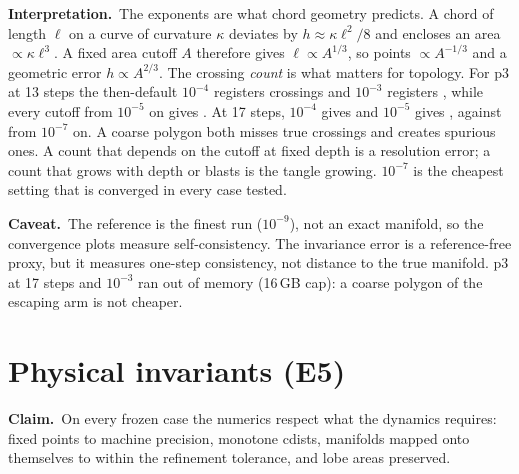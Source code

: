 \documentclass[11pt,a4paper]{article}
\newcommand{\claim}{\par\smallskip\noindent\textbf{Claim.}~}
\newcommand{\reading}{\par\smallskip\noindent\textbf{Interpretation.}~}
\newcommand{\caveat}{\par\smallskip\noindent\textbf{Caveat.}~}
\begin{document}
\reading The exponents are what chord geometry predicts. A chord of length
$\ell$ on a curve of curvature $\kappa$ deviates by $h\approx\kappa\ell^2/8$
and encloses an area $\propto\kappa\ell^3$. A fixed area cutoff $A$ therefore
gives $\ell\propto A^{1/3}$, so points $\propto A^{-1/3}$ and a geometric
error $h\propto A^{2/3}$. The crossing \emph{count} is what matters for
topology. For p3 at 13 steps the then-default $10^{-4}$ registers
\NumCrossingsPThreeThirteenCutoffFour{} crossings and $10^{-3}$ registers
\NumCrossingsPThreeThirteenCutoffThree, while every cutoff from $10^{-5}$ on
gives \NumCrossingsPThreeThirteenRef. At 17 steps, $10^{-4}$ gives
\NumCrossingsPThreeSeventeenCutoffFour{} and $10^{-5}$ gives
\NumCrossingsPThreeSeventeenCutoffFive, against \NumCrossingsPThreeSeventeenRef{}
from $10^{-7}$ on. A coarse polygon both misses true crossings and creates
spurious ones. A count that depends on the cutoff at fixed depth is a
resolution error; a count that grows with depth or blasts is the tangle
growing. $10^{-7}$ is the cheapest setting that is converged in every case
tested.

\caveat The reference is the finest run ($10^{-9}$), not an exact manifold,
so the convergence plots measure self-consistency. The invariance error is a
reference-free proxy, but it measures one-step consistency, not distance to
the true manifold. p3 at 17 steps and $10^{-3}$ ran out of memory (16\,GB
cap): a coarse polygon of the escaping arm is not cheaper.

\section{Physical invariants (E5)}
\label{sec:invariants}

\claim On every frozen case the numerics respect what the dynamics requires:
fixed points to machine precision, monotone cdists, manifolds mapped onto
themselves to within the refinement tolerance, and lobe areas preserved.
\end{document}

